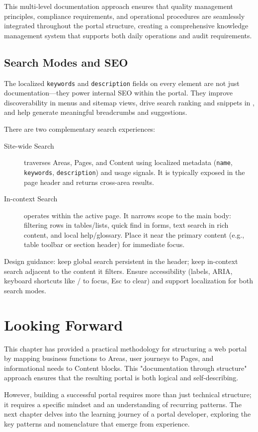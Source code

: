 This multi-level documentation approach ensures that quality management principles, compliance requirements, and operational procedures are seamlessly integrated throughout the portal structure, creating a comprehensive knowledge management system that supports both daily operations and audit requirements.

\subsection{Search Modes and SEO}
\label{sec:search-and-seo}

The localized \texttt{keywords} and \texttt{description} fields on every \wbdl{} element are not just documentation—they power internal SEO within the portal. They improve discoverability in menus and sitemap views, drive search ranking and snippets in \studio{}, and help generate meaningful breadcrumbs and suggestions.

There are two complementary search experiences:
\begin{description}
  \item[Site-wide Search] traverses Areas, Pages, and Content using localized metadata (\texttt{name}, \texttt{keywords}, \texttt{description}) and usage signals. It is typically exposed in the page header and returns cross-area results.
  \item[In-context Search] operates within the active page. It narrows scope to the main body: filtering rows in tables/lists, quick find in forms, text search in rich content, and local help/glossary. Place it near the primary content (e.g., table toolbar or section header) for immediate focus.
\end{description}

Design guidance: keep global search persistent in the header; keep in-context search adjacent to the content it filters. Ensure accessibility (labels, ARIA, keyboard shortcuts like / to focus, Esc to clear) and support localization for both search modes.

\section{Looking Forward}
\label{sec:portal-structure-forward}

This chapter has provided a practical methodology for structuring a web portal by mapping business functions to Areas, user journeys to Pages, and informational needs to Content blocks. This "documentation through structure" approach ensures that the resulting portal is both logical and self-describing.

However, building a successful portal requires more than just technical structure; it requires a specific mindset and an understanding of recurring patterns. The next chapter delves into the learning journey of a portal developer, exploring the key patterns and nomenclature that emerge from experience.
